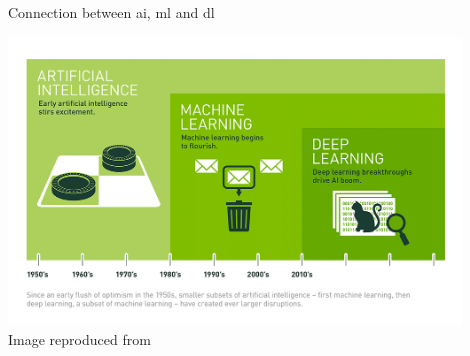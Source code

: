 \begin{frame}{Connection between \acrshort{ai}, \acrshort{ml} and \acrshort{dl}}

    \begin{center}
        \includegraphics[width=0.90\textwidth]{./images/dl_intro/ai_ml_dl.png}\\
        {\scriptsize Image reproduced from \cite{NVidiaBlog:DifferenceBetweenAIMLDL}}\\
    \end{center}

\end{frame}
    
